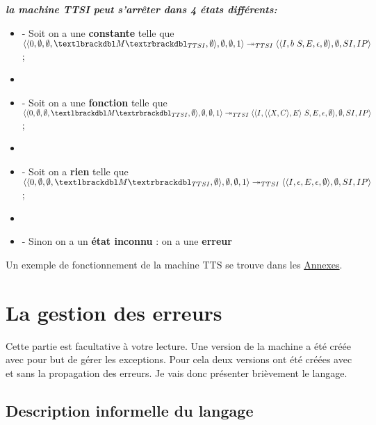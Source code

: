 \documentclass[10pt,a4paper]{report}
\begin{document}
	
\textbf{\textit{la machine TTSI peut s'arrêter dans 4 états différents:}}
\smallbreak
\begin{itemize}
	\item[] - Soit on a une \textbf{constante} telle que 
	$\langle\langle 0,\emptyset,\emptyset,\textlbrackdbl M\textrbrackdbl_{TTSI},\emptyset\rangle,\emptyset,\emptyset,1\rangle 
	\twoheadrightarrow_{TTSI} 
	\langle\langle I,b~S,E,\epsilon,\emptyset\rangle,\emptyset,SI,IP\rangle$;
	\item[] 
	\item[] - Soit on a une \textbf{fonction} telle que
	$\langle\langle 0,\emptyset,\emptyset,\textlbrackdbl M\textrbrackdbl_{TTSI},\emptyset\rangle,\emptyset,\emptyset,1\rangle 
	\twoheadrightarrow_{TTSI} 
	\langle\langle I,\langle\langle X,C\rangle,E\rangle~S,E,\epsilon,\emptyset\rangle,\emptyset,SI,IP\rangle$;
	\item[] 
	\item[] - Soit on a \textbf{rien} telle que  
	$\langle\langle 0,\emptyset,\emptyset,\textlbrackdbl M\textrbrackdbl_{TTSI},\emptyset\rangle,\emptyset,\emptyset,1\rangle 
	\twoheadrightarrow_{TTSI} 
	\langle\langle I,\epsilon,E,\epsilon,\emptyset\rangle,\emptyset,SI,IP\rangle$;
	\item[]
	\item[] - Sinon on a un \textbf{état inconnu} : on a une \textbf{erreur} 
\end{itemize}
\bigbreak


 Un exemple de fonctionnement de la machine TTS se trouve dans les \hyperref[TTSI]{Annexes}.
\newpage
	
	
	
	
	\section{La gestion des erreurs}
	
	Cette partie est facultative à votre lecture. Une version de la machine a été créée avec pour but de gérer les exceptions. Pour cela deux versions ont été créées avec et sans la propagation des erreurs. Je vais donc présenter brièvement le langage.
	
	\subsection{Description informelle du langage}
	
\end{document}
